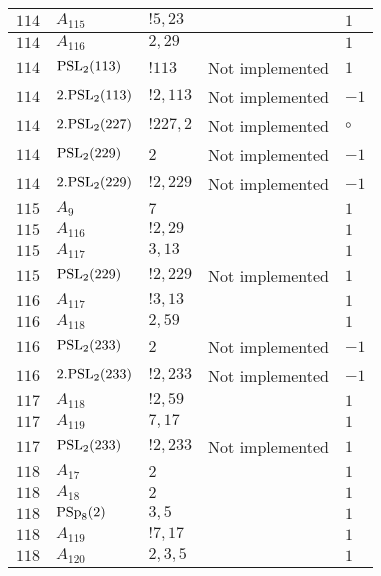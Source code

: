 \documentclass[a4paper, 11pt]{article}
\begin{document}
\begin{longtable}{lllll}
        $ 114 $ & $ A_{115} $ & $ !5, 23 $ & $ ~ $ & $ 1$ \\ \hline
        $ 114 $ & $ A_{116} $ & $ 2, 29 $ & $ ~ $ & $ 1$ \\ \hline
        $ 114 $ & $ {\rm PSL}_{2}(113) $ & $ !113 $ &  Not implemented & $ 1$ \\ \hline
        $ 114 $ & $ 2.{\rm PSL}_{2}(113) $ & $ !2, 113 $ &  Not implemented & $ -1$ \\ \hline
        $ 114 $ & $ 2.{\rm PSL}_{2}(227) $ & $ !227, 2 $ &  Not implemented &  $\circ$ \\ \hline
        $ 114 $ & $ {\rm PSL}_{2}(229) $ & $ 2 $ &  Not implemented & $ -1$ \\ \hline
        $ 114 $ & $ 2.{\rm PSL}_{2}(229) $ & $ !2, 229 $ &  Not implemented & $ -1$ \\ \hline
        $ 115 $ & $ A_{9} $ & $ 7 $ & $ ~ $ & $ 1$ \\ \hline
        $ 115 $ & $ A_{116} $ & $ !2, 29 $ & $ ~ $ & $ 1$ \\ \hline
        $ 115 $ & $ A_{117} $ & $ 3, 13 $ & $ ~ $ & $ 1$ \\ \hline
        $ 115 $ & $ {\rm PSL}_{2}(229) $ & $ !2, 229 $ &  Not implemented & $ 1$ \\ \hline
        $ 116 $ & $ A_{117} $ & $ !3, 13 $ & $ ~ $ & $ 1$ \\ \hline
        $ 116 $ & $ A_{118} $ & $ 2, 59 $ & $ ~ $ & $ 1$ \\ \hline
        $ 116 $ & $ {\rm PSL}_{2}(233) $ & $ 2 $ &  Not implemented & $ -1$ \\ \hline
        $ 116 $ & $ 2.{\rm PSL}_{2}(233) $ & $ !2, 233 $ &  Not implemented & $ -1$ \\ \hline
        $ 117 $ & $ A_{118} $ & $ !2, 59 $ & $ ~ $ & $ 1$ \\ \hline
        $ 117 $ & $ A_{119} $ & $ 7, 17 $ & $ ~ $ & $ 1$ \\ \hline
        $ 117 $ & $ {\rm PSL}_{2}(233) $ & $ !2, 233 $ &  Not implemented & $ 1$ \\ \hline
        $ 118 $ & $ A_{17} $ & $ 2 $ & $ ~ $ & $ 1$ \\ \hline
        $ 118 $ & $ A_{18} $ & $ 2 $ & $ ~ $ & $ 1$ \\ \hline
        $ 118 $ & $ {\rm PSp}_{8}(2) $ & $ 3,5 $ & $ ~ $ & $ 1$ \\ \hline
        $ 118 $ & $ A_{119} $ & $ !7, 17 $ & $ ~ $ & $ 1$ \\ \hline
        $ 118 $ & $ A_{120} $ & $ 2, 3, 5 $ & $ ~ $ & $ 1$ \\ \hline

\end{longtable}
\end{document}
